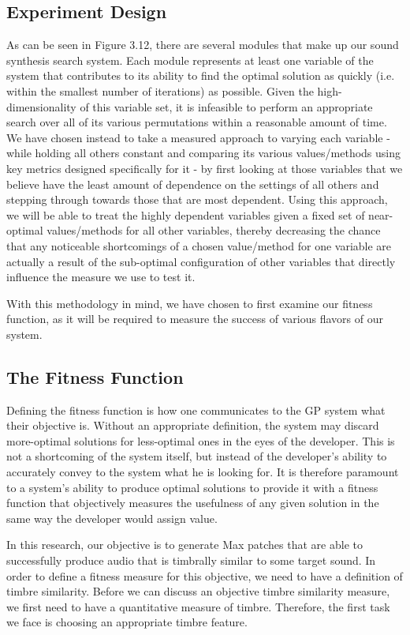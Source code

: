 \documentclass[a4paper,12pt]{report} 	%
\numberwithin{figure}{chapter}
\numberwithin{table}{chapter}
\numberwithin{equation}{chapter}
\begin{document}
\begin{flushleft}
\section{Experiment Design}
As can be seen in Figure 3.12, there are several modules that make up our sound synthesis search system. Each module represents at least one variable of the system that contributes to its ability to find the optimal solution as quickly (i.e. within the smallest number of iterations) as possible. Given the high-dimensionality of this variable set, it is infeasible to perform an appropriate search over all of its various permutations within a reasonable amount of time. We have chosen instead to take a measured approach to varying each variable - while holding all others constant and comparing its various values/methods using key metrics designed specifically for it - by first looking at those variables that we believe have the least amount of dependence on the settings of all others and stepping through towards those that are most dependent. Using this approach, we will be able to treat the highly dependent variables given a fixed set of near-optimal values/methods for all other variables, thereby decreasing the chance that any noticeable shortcomings of a chosen value/method for one variable are actually a result of the sub-optimal configuration of other variables that directly influence the measure we use to test it.

With this methodology in mind, we have chosen to first examine our fitness function, as it will be required to measure the success of various flavors of our system.

\subsection{The Fitness Function}
Defining the fitness function is how one communicates to the GP system what their objective is. Without an appropriate definition, the system may discard more-optimal solutions for less-optimal ones in the eyes of the developer. This is not a shortcoming of the system itself, but instead of the developer's ability to accurately convey to the system what he is looking for. It is therefore paramount to a system's ability to produce optimal solutions to provide it with a fitness function that objectively measures the usefulness of any given solution in the same way the developer would assign value.

In this research, our objective is to generate Max patches that are able to successfully produce audio that is timbrally similar to some target sound. In order to define a fitness measure for this objective, we need to have a definition of timbre similarity. Before we can discuss an objective timbre similarity measure, we first need to have a quantitative measure of timbre. Therefore, the first task we face is choosing an appropriate timbre feature.


\end{flushleft}
\end{document}

